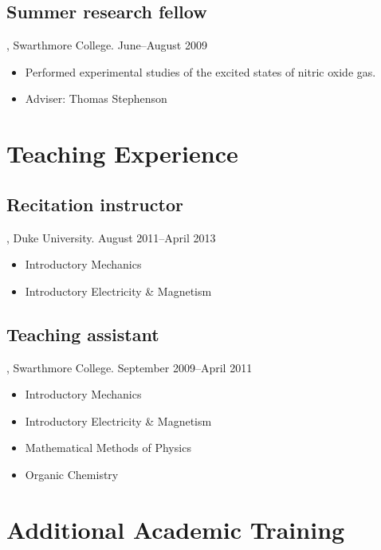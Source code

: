 \documentclass[letterpaper,10pt]{article}
\begin{document}
\subsection{Summer research fellow}, Swarthmore College. \hfill June--August 2009

\begin{itemize}
  \item Performed experimental studies of the excited states of nitric oxide gas.
  \item Adviser:  Thomas Stephenson
\end{itemize}



\pagebreak



\section{Teaching Experience}

\subsection{Recitation instructor}, Duke University. \hfill August 2011--April 2013

\begin{itemize}
  \item Introductory Mechanics
  \item Introductory Electricity \& Magnetism
\end{itemize}


\subsection{Teaching assistant}, Swarthmore College. \hfill September 2009--April 2011

\begin{itemize}
  \item Introductory Mechanics
  \item Introductory Electricity \& Magnetism
  \item Mathematical Methods of Physics
  \item Organic Chemistry
\end{itemize}



\section{Additional Academic Training}
\end{document}
